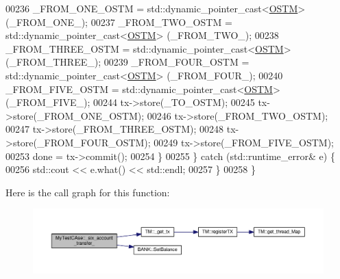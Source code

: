 \begin{DoxyCode}
00236             \_FROM\_ONE\_OSTM = std::dynamic\_pointer\_cast<\hyperlink{class_o_s_t_m}{OSTM}> (\_FROM\_ONE\_);
00237             \_FROM\_TWO\_OSTM = std::dynamic\_pointer\_cast<\hyperlink{class_o_s_t_m}{OSTM}> (\_FROM\_TWO\_);
00238             \_FROM\_THREE\_OSTM = std::dynamic\_pointer\_cast<\hyperlink{class_o_s_t_m}{OSTM}> (\_FROM\_THREE\_);
00239             \_FROM\_FOUR\_OSTM = std::dynamic\_pointer\_cast<\hyperlink{class_o_s_t_m}{OSTM}> (\_FROM\_FOUR\_);
00240             \_FROM\_FIVE\_OSTM = std::dynamic\_pointer\_cast<\hyperlink{class_o_s_t_m}{OSTM}> (\_FROM\_FIVE\_);
00244             tx->store(\_TO\_OSTM);
00245             tx->store(\_FROM\_ONE\_OSTM);
00246             tx->store(\_FROM\_TWO\_OSTM);
00247             tx->store(\_FROM\_THREE\_OSTM);
00248             tx->store(\_FROM\_FOUR\_OSTM);
00249             tx->store(\_FROM\_FIVE\_OSTM);
00253             done = tx->commit();
00254         \}
00255     \} \textcolor{keywordflow}{catch} (std::runtime\_error& e) \{
00256         std::cout << e.what() << std::endl;
00257     \}
00258 \}
\end{DoxyCode}


Here is the call graph for this function\+:
\nopagebreak
\begin{figure}[H]
\begin{center}
\leavevmode
\includegraphics[width=350pt]{class_my_test_c_ase_a72ce436fb3c78c3d76b6c48a5a2e6a76_a72ce436fb3c78c3d76b6c48a5a2e6a76_cgraph}
\end{center}
\end{figure}



